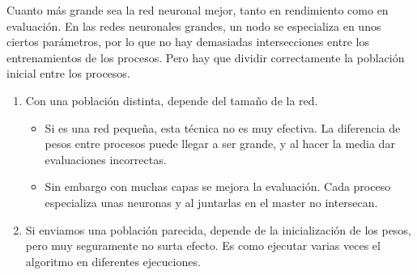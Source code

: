 	Cuanto más grande sea la red neuronal mejor, tanto en rendimiento como en evaluación. En las redes neuronales grandes, un nodo se especializa en unos ciertos parámetros, por lo que no hay demasiadas intersecciones entre los entrenamientos de los procesos. Pero hay que dividir correctamente la población inicial entre los procesos. 
	
	\begin{enumerate}
		\item Con una población distinta, depende del tamaño de la red. 
		\begin{itemize}
			\item Si es una red pequeña, esta técnica no es muy efectiva. La diferencia de pesos entre procesos puede llegar a ser grande, y al hacer la media dar evaluaciones incorrectas. 		
			\item Sin embargo con muchas capas se mejora la evaluación. Cada proceso especializa unas neuronas y al juntarlas en el master no intersecan.			
		\end{itemize}		
		\item Si enviamos una población parecida, depende de la inicialización de los pesos, pero muy seguramente no surta efecto. Es como ejecutar varias veces el algoritmo en diferentes ejecuciones.
		
	\end{enumerate}	
	
	

	